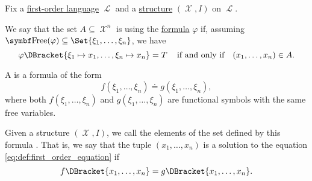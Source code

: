 \begin{definition}\label{def:first_order_definability}
  Fix a \hyperref[def:first_order_syntax]{first-order language} \( \mscrL \) and a \hyperref[def:first_order_structure]{structure} \( (\mscrX, I) \) on \( \mscrL \).

  We say that the set \( A \subseteq \mscrX^n \) is  using the \hyperref[def:first_order_syntax]{formula} \( \varphi \) if, assuming \( {\Bold{Free}(\varphi) \subseteq \Set{ \xi_1, \ldots, \xi_n }} \), we have
  \begin{equation*}
    \varphi\DBracket{\xi_1 \mapsto x_1, \ldots, \xi_n \mapsto x_n} = T \quad\T{if and only if}\quad (x_1, \ldots, x_n) \in A.
  \end{equation*}
\end{definition}

\begin{definition}\label{def:first_order_equation}
  A  is a formula of the form
  \begin{equation}\label{eq:def:first_order_equation}
    f(\xi_1, \ldots, \xi_n) \doteq g(\xi_1, \ldots, \xi_n),
  \end{equation}
  where both \( f(\xi_1, \ldots, \xi_n) \) and \( g(\xi_1, \ldots, \xi_n) \) are functional symbols with the same free variables.

  Given a structure \( (\mscrX, I) \), we call the elements of the set defined by this formula . That is, we say that the tuple \( (x_1, \ldots, x_n) \) is a solution to the equation \eqref{eq:def:first_order_equation} if
  \begin{equation*}
    f\DBracket{x_1, \ldots, x_n} = g\DBracket{x_1, \ldots, x_n}.
  \end{equation*}
\end{definition}

